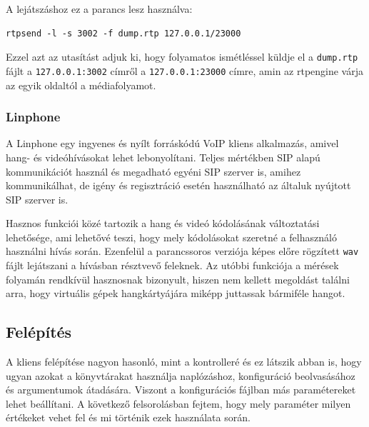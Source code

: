 A lejátszáshoz ez a parancs lesz használva: 

\begin{lstlisting}[caption=RTP folyam generálásda rtpsend segítségével, label=lst:rtpsend]
rtpsend -l -s 3002 -f dump.rtp 127.0.0.1/23000
\end{lstlisting}

Ezzel azt az utasítást adjuk ki, hogy folyamatos ismétléssel küldje el a 
\texttt{dump.rtp} fájlt a \texttt{127.0.0.1:3002} címről a \texttt{127.0.0.1:23000}
címre, amin az rtpengine várja az egyik oldaltól a médiafolyamot.

\subsubsection{Linphone}

A Linphone egy ingyenes és nyílt forráskódú VoIP kliens alkalmazás, amivel hang- és 
videóhívásokat lehet lebonyolítani. Teljes mértékben SIP alapú kommunikációt használ és 
megadható egyéni SIP szerver is, amihez kommunikálhat, de igény és regisztráció esetén
használható az általuk nyújtott SIP szerver is. 

Hasznos funkciói közé tartozik a hang és videó kódolásának változtatási lehetősége, ami
lehetővé teszi, hogy mely kódolásokat szeretné a felhasználó használni hívás során.
Ezenfelül a parancssoros verziója képes előre rögzített \texttt{wav} fájlt lejátszani
a hívásban résztvevő feleknek. Az utóbbi funkciója a mérések folyamán rendkívül 
hasznosnak bizonyult, hiszen nem kellett megoldást találni arra, hogy virtuális gépek 
hangkártyájára miképp juttassak bármiféle hangot. 

\subsection{Felépítés}

A kliens felépítése nagyon hasonló, mint a kontrolleré és ez látszik abban is, hogy
ugyan azokat a könyvtárakat használja naplózáshoz, konfiguráció beolvasásához és
argumentumok átadására. Viszont a konfigurációs fájlban más paramétereket lehet 
beállítani. A következő felsorolásban fejtem, hogy mely paraméter milyen értékeket 
vehet fel és mi történik ezek használata során. 

